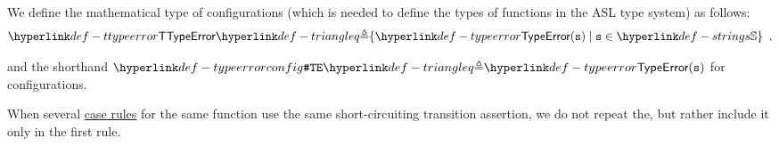 We define the mathematical type of \typingerrorterm{} configurations
(which is needed to define the types of functions in the ASL type system)
as follows:
\hypertarget{def-ttypeerror}{}
\[
  \TTypeError \triangleq \{\TypeErrorVal{\vs} \;|\; \vs \in \Strings \} \enspace.
\]

\hypertarget{def-typeerrorconfig}{}
and the shorthand $\TypeErrorConfig \triangleq \TypeError(\vs)$ for \typingerrorterm{} configurations.

%
When several \hyperlink{def-caserules}{case rules} for the same function use the same short-circuiting transition assertion,
we do not repeat the\ProseOrTypeError, but rather include it only in the first rule.

